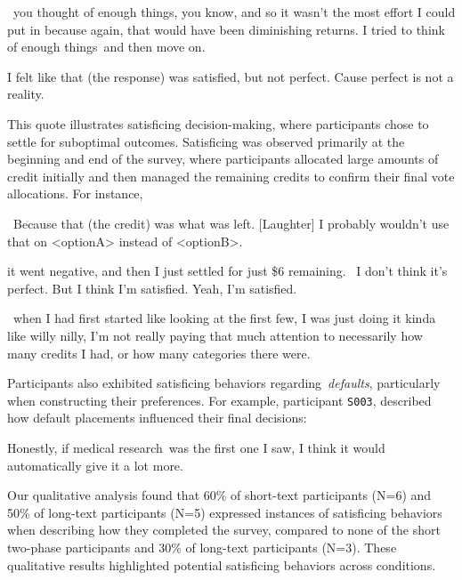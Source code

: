 \begin{displayquote}
    ~\bracketellipsis you thought of enough things, you know, and so it wasn't the most effort I could put in because again, that would have been diminishing returns. I tried to think of enough things~\bracketellipsis and then move on.~\bracketellipsis
    \hfill{}
\end{displayquote}

\begin{displayquote}
    I felt like that (the response) was satisfied, but not perfect. Cause perfect is not a reality. \hfill{}
\end{displayquote}

This quote illustrates satisficing decision-making, where participants chose to settle for suboptimal outcomes. Satisficing was observed primarily at the beginning and end of the survey, where participants allocated large amounts of credit initially and then managed the remaining credits to confirm their final vote allocations. For instance, 

\begin{displayquote}
    ~\bracketellipsis Because that (the credit) was what was left. [Laughter] I probably wouldn't use that on <optionA> instead of <optionB>.~\bracketellipsis \hfill{}
\end{displayquote}
\begin{displayquote}
    \bracketellipsis it went negative, and then I just settled for just \$6 remaining. ~\bracketellipsis I don't think it's perfect. But I think I'm satisfied. Yeah, I'm satisfied.  \hfill{}
\end{displayquote}
\begin{displayquote}
    ~\bracketellipsis when I had first started like looking at the first few, I was just doing it kinda like willy nilly, I'm not really paying that much attention to necessarily how many credits I had, or how many categories there were. \hfill{}
\end{displayquote}

Participants also exhibited satisficing behaviors regarding~\textit{defaults}, particularly when constructing their preferences. For example, participant \texttt{S003}, described how default placements influenced their final decisions:

\begin{displayquote}
    Honestly, if medical research~\bracketellipsis was the first one I saw, I think it would automatically give it a lot more. \hfill{}
\end{displayquote}

Our qualitative analysis found that 60\% of short-text participants (N=6) and 50\% of long-text participants (N=5) expressed instances of satisficing behaviors when describing how they completed the survey, compared to none of the short two-phase participants and 30\% of long-text participants (N=3). These qualitative results highlighted potential satisficing behaviors across conditions.
